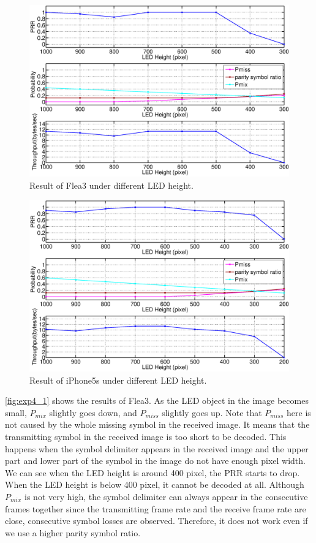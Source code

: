 \begin{figure}[!htb] 
  \includegraphics[scale=0.25]{fig/exp4_flea_new.eps}
  \caption{Result of Flea3 under different LED height.}
  \label{fig:exp4_1}
\end{figure}
\begin{figure}[!htb] 
  \includegraphics[scale=0.25]{fig/exp4_iphone5s_new.eps}
  \caption{Result of iPhone5s under different LED height.}
  \label{fig:exp4_2}
\end{figure}

\autoref{fig:exp4_1} shows the results of Flea3. As the LED object in the image becomes small, $P_{mix}$ slightly goes down, and $P_{miss}$ slightly goes up. Note that $P_{miss}$ here is not caused by the whole missing symbol in the received image. It means that the transmitting symbol in the received image is too short to be decoded. This happens when the symbol delimiter appears in the received image and the upper part and lower part of the symbol in the image do not have enough pixel width. We can see when the LED height is around 400 pixel, the PRR starts to drop. When the LED height is below 400 pixel, it cannot be decoded at all. Although $P_{mix}$ is not very high, the symbol delimiter can always appear in the consecutive frames together since the transmitting frame rate and the receive frame rate are close, consecutive symbol losses are observed. Therefore, it does not work even if we use a higher parity symbol ratio. 

